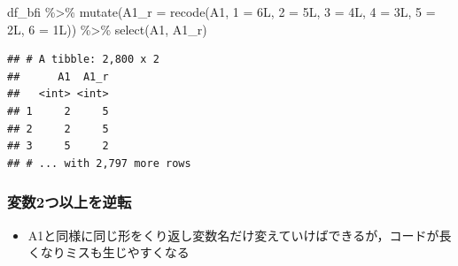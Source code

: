 \documentclass[
  xelatex,ja=standard, b5paper]{bxjsbook}
\newenvironment{Shaded}{\begin{snugshade}}{\end{snugshade}}
\newcommand{\AttributeTok}[1]{\textcolor[rgb]{0.77,0.63,0.00}{#1}}
\newcommand{\FunctionTok}[1]{\textcolor[rgb]{0.00,0.00,0.00}{#1}}
\newcommand{\NormalTok}[1]{#1}
\newcommand{\OtherTok}[1]{\textcolor[rgb]{0.56,0.35,0.01}{#1}}
\newcommand{\SpecialCharTok}[1]{\textcolor[rgb]{0.00,0.00,0.00}{#1}}
\newcommand{\StringTok}[1]{\textcolor[rgb]{0.31,0.60,0.02}{#1}}
\providecommand{\tightlist}{%
  \setlength{\itemsep}{0pt}\setlength{\parskip}{0pt}}
\begin{document}
\begin{Shaded}
\begin{Highlighting}[]
\NormalTok{df\_bfi }\SpecialCharTok{\%\textgreater{}\%} 
  \FunctionTok{mutate}\NormalTok{(}\AttributeTok{A1\_r =} \FunctionTok{recode}\NormalTok{(A1, }\StringTok{\textasciigrave{}}\AttributeTok{1}\StringTok{\textasciigrave{}} \OtherTok{=}\NormalTok{ 6L, }\StringTok{\textasciigrave{}}\AttributeTok{2}\StringTok{\textasciigrave{}} \OtherTok{=}\NormalTok{ 5L, }\StringTok{\textasciigrave{}}\AttributeTok{3}\StringTok{\textasciigrave{}} \OtherTok{=}\NormalTok{ 4L,      }
                           \StringTok{\textasciigrave{}}\AttributeTok{4}\StringTok{\textasciigrave{}} \OtherTok{=}\NormalTok{ 3L, }\StringTok{\textasciigrave{}}\AttributeTok{5}\StringTok{\textasciigrave{}} \OtherTok{=}\NormalTok{ 2L, }\StringTok{\textasciigrave{}}\AttributeTok{6}\StringTok{\textasciigrave{}} \OtherTok{=}\NormalTok{ 1L)) }\SpecialCharTok{\%\textgreater{}\%} 
  \FunctionTok{select}\NormalTok{(A1, A1\_r)}
\end{Highlighting}
\end{Shaded}

\begin{verbatim}
## # A tibble: 2,800 x 2
##      A1  A1_r
##   <int> <int>
## 1     2     5
## 2     2     5
## 3     5     2
## # ... with 2,797 more rows
\end{verbatim}

\hypertarget{mu-rev-recode2}{%
\subsubsection{変数2つ以上を逆転}\label{mu-rev-recode2}}

\begin{itemize}
\tightlist
\item
  A1と同様に同じ形をくり返し変数名だけ変えていけばできるが，コードが長くなりミスも生じやすくなる
\end{itemize}
\end{document}
